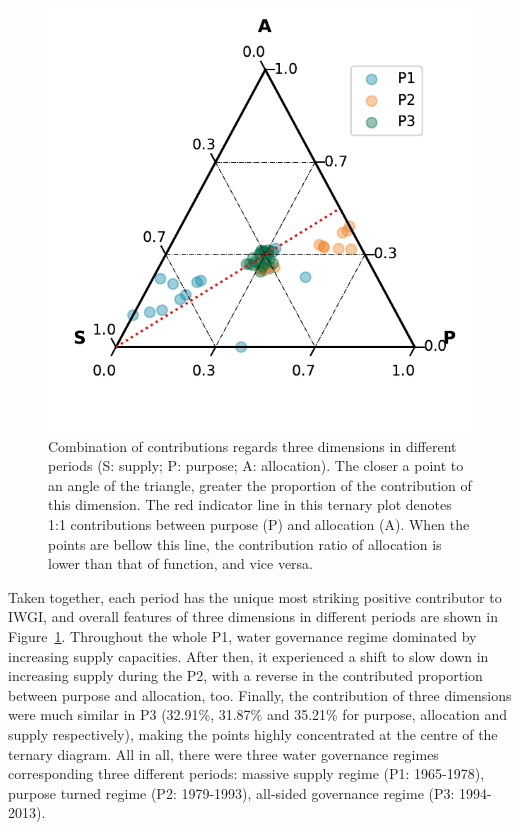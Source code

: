 \documentclass[9pt, twocolumn, twoside, lineno]{pnas-new}
\begin{document}
\begin{figure}[!htbp]
	\centering
	\includegraphics[width=0.9\linewidth]{../../figures/main/phases.pdf}
	\caption{Combination of contributions regards three dimensions in different periods (S: supply; P: purpose; A: allocation). The closer a point to an angle of the triangle, greater the proportion of the contribution of this dimension.
	The red indicator line in this ternary plot denotes 1:1 contributions between purpose (P) and allocation (A). When the points are bellow this line, the contribution ratio of allocation is lower than that of function, and vice versa.}
	\label{fig:phases}
\end{figure}

Taken together, each period has the unique most striking positive contributor to IWGI, and overall features of three dimensions in different periods are shown in Figure~\ref{fig:phases}.
Throughout the whole P1, water governance regime dominated by increasing supply capacities. After then, it experienced a shift to slow down in increasing supply during the P2, with a reverse in the contributed proportion between purpose and allocation, too.
Finally, the contribution of three dimensions were much similar in P3 (32.91\%, 31.87\% and 35.21\% for purpose, allocation and supply respectively), making the points highly concentrated at the centre of the ternary diagram.
All in all, there were three water governance regimes corresponding three different periods: massive supply regime (P1: 1965-1978), purpose turned regime (P2: 1979-1993), all-sided governance regime (P3: 1994-2013). 
\end{document}
